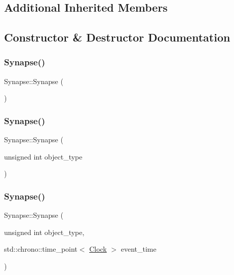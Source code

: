 \subsection*{Additional Inherited Members}


\subsection{Constructor \& Destructor Documentation}
\mbox{\label{classSynapse_a68e6c8546084f93ae7d39af6986562fb}} 
\subsubsection{\texorpdfstring{Synapse()}{Synapse()}\hspace{0.1cm}{\footnotesize\ttfamily [1/4]}}
{\footnotesize\ttfamily Synapse\+::\+Synapse (\begin{DoxyParamCaption}{ }\end{DoxyParamCaption})\hspace{0.3cm}{\ttfamily [inline]}}

\mbox{\label{classSynapse_a821e35d693de963edb6d5aa9e565dfde}} 
\subsubsection{\texorpdfstring{Synapse()}{Synapse()}\hspace{0.1cm}{\footnotesize\ttfamily [2/4]}}
{\footnotesize\ttfamily Synapse\+::\+Synapse (\begin{DoxyParamCaption}\item[{unsigned int}]{object\+\_\+type }\end{DoxyParamCaption})\hspace{0.3cm}{\ttfamily [inline]}}

\mbox{\label{classSynapse_a339a3dff64e545fc7c013b251737257b}} 
\subsubsection{\texorpdfstring{Synapse()}{Synapse()}\hspace{0.1cm}{\footnotesize\ttfamily [3/4]}}
{\footnotesize\ttfamily Synapse\+::\+Synapse (\begin{DoxyParamCaption}\item[{unsigned int}]{object\+\_\+type,  }\item[{std\+::chrono\+::time\+\_\+point$<$ \mbox{\hyperlink{universe_8h_a0ef8d951d1ca5ab3cfaf7ab4c7a6fd80}{Clock}} $>$}]{event\+\_\+time }\end{DoxyParamCaption})\hspace{0.3cm}{\ttfamily [inline]}}

